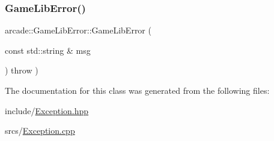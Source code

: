 \mbox{\label{classarcade_1_1_game_lib_error_ae409cbfd8f358f41a45eac59a1843b8b}} 
\subsubsection{\texorpdfstring{Game\+Lib\+Error()}{GameLibError()}}
{\footnotesize\ttfamily arcade\+::\+Game\+Lib\+Error\+::\+Game\+Lib\+Error (\begin{DoxyParamCaption}\item[{const std\+::string \&}]{msg }\end{DoxyParamCaption}) throw  ) }



The documentation for this class was generated from the following files\+:\begin{DoxyCompactItemize}
\item 
include/\hyperlink{_exception_8hpp}{Exception.\+hpp}\item 
srcs/\hyperlink{_exception_8cpp}{Exception.\+cpp}\end{DoxyCompactItemize}
